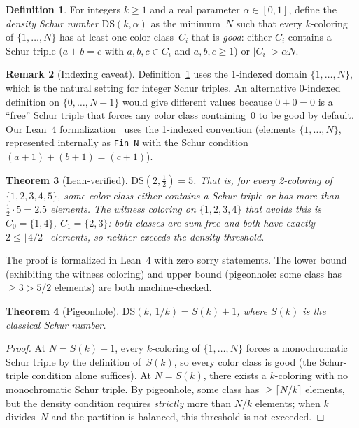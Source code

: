\documentclass[11pt]{article}
\theoremstyle{plain}
\newtheorem{theorem}{Theorem}[section]
\theoremstyle{definition}
\newtheorem{definition}[theorem]{Definition}
\newtheorem{remark}[theorem]{Remark}
\newcommand{\DS}{\mathrm{DS}}
\begin{document}
\begin{definition}\label{def:ds}
For integers $k\ge 1$ and a real parameter $\alpha\in[0,1]$,
define the \emph{density Schur number} $\DS(k,\alpha)$ as the
minimum~$N$ such that every $k$-coloring of $\{1,\ldots,N\}$ has at
least one color class~$C_i$ that is \emph{good}: either $C_i$
contains a Schur triple ($a+b=c$ with $a,b,c\in C_i$ and
$a,b,c\ge 1$) or $|C_i| > \alpha N$.
\end{definition}

\begin{remark}[Indexing caveat]\label{rem:index}
Definition~\ref{def:ds} uses the 1-indexed domain $\{1,\ldots,N\}$,
which is the natural setting for integer Schur triples.
An alternative 0-indexed definition on $\{0,\ldots,N-1\}$ would give
different values because $0+0=0$ is a ``free'' Schur triple that
forces any color class containing~0 to be good by default.
Our Lean~4 formalization~\cite{code-repo} uses the
1-indexed convention (elements $\{1,\ldots,N\}$, represented
internally as \texttt{Fin~N} with the Schur condition
$(a+1)+(b+1)=(c+1)$).
\end{remark}

\begin{theorem}[Lean-verified]\label{thm:ds2}
$\DS(2,\tfrac{1}{2}) = 5$.
That is, for every 2-coloring of $\{1,2,3,4,5\}$, some
color class either contains a Schur triple or has more than
$\tfrac{1}{2}\cdot 5 = 2.5$ elements.
The witness coloring on $\{1,2,3,4\}$ that avoids this is
$C_0=\{1,4\}$, $C_1=\{2,3\}$: both classes are sum-free and both
have exactly $2 \le \lfloor 4/2 \rfloor$ elements, so neither
exceeds the density threshold.
\end{theorem}

\noindent
The proof is formalized in Lean~4 with zero sorry statements.
The lower bound (exhibiting the witness coloring) and upper bound
(pigeonhole: some class has $\ge 3 > 5/2$ elements) are both
machine-checked.

\begin{theorem}[Pigeonhole]\label{thm:ds-pigeonhole}
$\DS(k,\, 1/k) = S(k)+1$,
where $S(k)$ is the classical Schur number.
\end{theorem}

\begin{proof}
At $N = S(k)+1$, every $k$-coloring of $\{1,\ldots,N\}$ forces a
monochromatic Schur triple by the definition of~$S(k)$, so every
color class is good (the Schur-triple condition alone suffices).
At $N = S(k)$, there exists a $k$-coloring with no monochromatic
Schur triple.
By pigeonhole, some class has $\ge \lceil N/k \rceil$ elements, but
the density condition requires \emph{strictly} more than $N/k$
elements; when $k$ divides~$N$ and the partition is balanced, this
threshold is not exceeded.
\end{proof}
\end{document}
